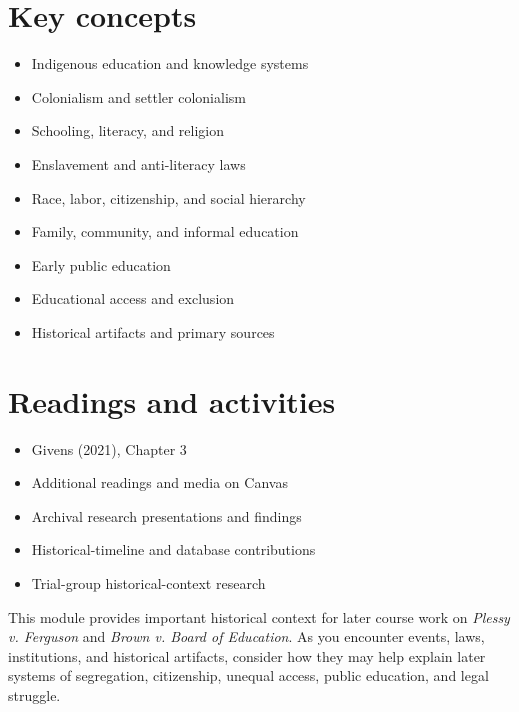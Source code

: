 \documentclass[
  letterpaper,
  DIV=11,
  numbers=noendperiod]{scrartcl}
\providecommand{\tightlist}{%
  \setlength{\itemsep}{0pt}\setlength{\parskip}{0pt}}\usepackage{longtable,booktabs,array}
\begin{document}
\section{Key concepts}\label{key-concepts}

\begin{itemize}
\tightlist
\item
  Indigenous education and knowledge systems
\item
  Colonialism and settler colonialism
\item
  Schooling, literacy, and religion
\item
  Enslavement and anti-literacy laws
\item
  Race, labor, citizenship, and social hierarchy
\item
  Family, community, and informal education
\item
  Early public education
\item
  Educational access and exclusion
\item
  Historical artifacts and primary sources
\end{itemize}

\section{Readings and activities}\label{readings-and-activities}

\begin{itemize}
\tightlist
\item
  Givens (2021), Chapter 3
\item
  Additional readings and media on Canvas
\item
  Archival research presentations and findings
\item
  Historical-timeline and database contributions
\item
  Trial-group historical-context research
\end{itemize}

\begin{tcolorbox}[enhanced jigsaw, bottomtitle=1mm, opacityback=0, opacitybacktitle=0.6, bottomrule=.15mm, toptitle=1mm, titlerule=0mm, left=2mm, title=\textcolor{quarto-callout-note-color}{\faInfo}\hspace{0.5em}{Trial connection}, rightrule=.15mm, colback=white, colframe=quarto-callout-note-color-frame, toprule=.15mm, breakable, colbacktitle=quarto-callout-note-color!10!white, coltitle=black, arc=.35mm, leftrule=.75mm]

This module provides important historical context for later course work
on \emph{Plessy v. Ferguson} and \emph{Brown v. Board of Education}. As
you encounter events, laws, institutions, and historical artifacts,
consider how they may help explain later systems of segregation,
citizenship, unequal access, public education, and legal struggle.

\end{tcolorbox}
\end{document}
